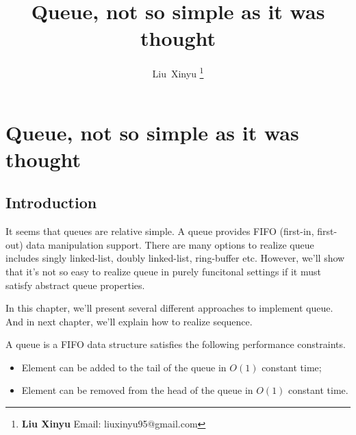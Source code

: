 \documentclass{article}
\begin{document}
\fi


\title{Queue, not so simple as it was thought}

\author{Liu~Xinyu
\thanks{{\bfseries Liu Xinyu } \newline
  Email: liuxinyu95@gmail.com \newline}
  }


\maketitle

\ifx\wholebook\relax
\chapter{Queue, not so simple as it was thought}
\fi

\section{Introduction}
\label{introduction}
It seems that queues are relative simple. A queue provides FIFO (first-in,
first-out) data manipulation support. There are many options to 
realize queue includes singly linked-list, doubly linked-list,
ring-buffer etc. However, we'll show that it's not so easy to 
realize queue in purely funcitonal settings if it must satisfy
abstract queue properties.

In this chapter, we'll present several different approaches to 
implement queue. And in next chapter, we'll explain how to realize
sequence.

A queue is a FIFO data structure satisfies the following performance
constraints.

\begin{itemize}
\item Element can be added to the tail of the queue in $O(1)$ constant time;
\item Element can be removed from the head of the queue in $O(1)$ constant time.
\end{itemize}
\end{document}
